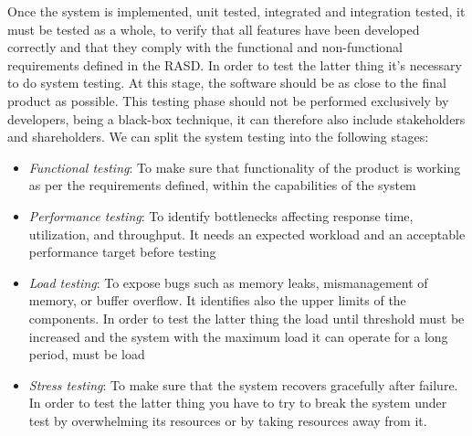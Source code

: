 Once the system is implemented, unit tested, integrated and integration tested, it must be tested as a whole, to verify that all features have been developed correctly and that they comply with the functional and non-functional requirements defined in the RASD. In order to test the latter thing it's necessary to do system testing. At this stage, the software should be as close to the final product as possible. This testing phase should not be performed exclusively by developers, being a black-box technique, it can therefore also include stakeholders and shareholders. We can split the system testing into the following stages:
\begin{itemize}
    \item \textit{Functional testing}: To make sure that functionality of the product is working as per the requirements defined, within the capabilities of the system
    \item \textit{Performance testing}: To identify bottlenecks affecting response time, utilization, and throughput. It needs an expected workload and an acceptable performance target before testing
    \item \textit{Load testing}: To expose bugs such as memory leaks, mismanagement of memory, or buffer overflow. It identifies also the upper limits of the components. In order to test the latter thing the load until threshold must be increased and the system with the maximum load it can operate for a long period, must be load
    \item \textit{Stress testing}: To make sure that the system recovers gracefully after failure. In order to test the latter thing you have to try to break the system under test by overwhelming its resources or by taking resources away from it.
\end{itemize}